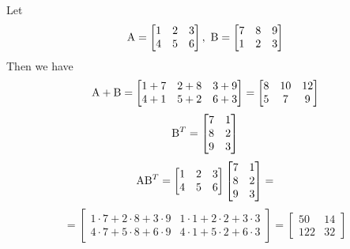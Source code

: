 \begin{example}
    Let
    $$
        \mat{A} = \left[\begin{matrix}
        1 & 2 & 3 \\
        4 & 5 & 6
        \end{matrix}\right],\ 
        \mat{B} = \left[\begin{matrix}
        7 & 8 & 9 \\
        1 & 2 & 3
        \end{matrix}\right]
    $$
    Then we have
    $$
        \mathrm{A} + \mathrm{B} = 
        \left[\begin{matrix}
        1+7 & 2+8 & 3+9 \\
        4+1 & 5+2 & 6+3
        \end{matrix}\right] =
        \left[\begin{matrix}
        8 & 10 & 12 \\
        5 & 7 & 9
        \end{matrix}\right]
    $$
    $$
        \mathrm{B}^T =
        \left[\begin{matrix}
        7 & 1 \\
        8 & 2 \\
        9 & 3
        \end{matrix}\right]
    $$
    $$
        \mathrm{A}\mathrm{B}^T =
        \left[\begin{matrix}
        1 & 2 & 3 \\
        4 & 5 & 6
        \end{matrix}\right]
        \left[\begin{matrix}
        7 & 1 \\
        8 & 2 \\
        9 & 3
        \end{matrix}\right] =
    $$
    $$
        = \left[\begin{matrix}
        1 \cdot 7 + 2 \cdot 8 + 3 \cdot 9 & 1 \cdot 1 + 2 \cdot 2 + 3 \cdot 3 \\
        4 \cdot 7 + 5 \cdot 8 + 6 \cdot 9 & 4 \cdot 1 + 5 \cdot 2 + 6 \cdot 3
        \end{matrix}\right] = 
        \left[\begin{matrix}
        50 & 14 \\
        122 & 32
        \end{matrix}\right]
    $$
\end{example}